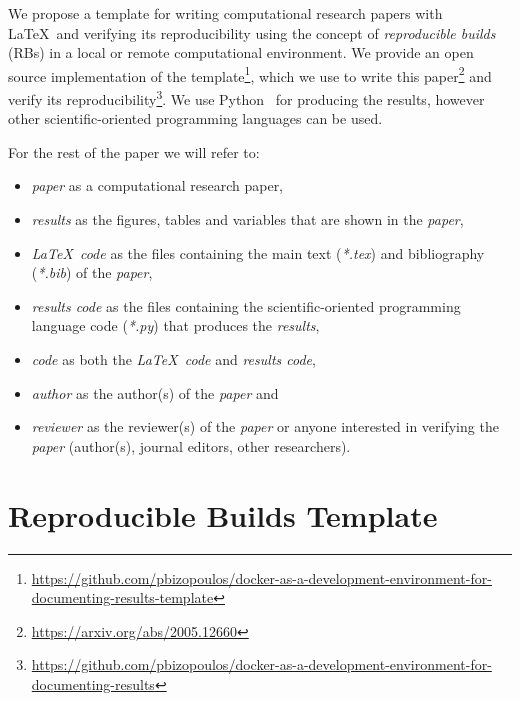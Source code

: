 \documentclass[journal]{IEEEtran}
\begin{document}
We propose a template for writing computational research papers with \LaTeX\ and verifying  its reproducibility using the concept of \textit{reproducible builds} (RBs) in a local or remote computational environment.
We provide an open source implementation of the template\footnote{\url{https://github.com/pbizopoulos/docker-as-a-development-environment-for-documenting-results-template}}, which we use to write this paper\footnote{\url{https://arxiv.org/abs/2005.12660}} and verify its reproducibility\footnote{\url{https://github.com/pbizopoulos/docker-as-a-development-environment-for-documenting-results}}.
We use Python~\cite{van2007python} for producing the results, however other scientific-oriented programming languages can be used.

For the rest of the paper we will refer to:
\begin{itemize}
	\item \textit{paper} as a computational research paper,
	\item \textit{results} as the figures, tables and variables that are shown in the \textit{paper},
	\item \textit{\LaTeX\ code} as the files containing the main text (\textit{*.tex}) and bibliography (\textit{*.bib}) of the \textit{paper},
	\item \textit{results code} as the files containing the scientific-oriented programming language code (\textit{*.py}) that produces the \textit{results},
	\item \textit{code} as both the \textit{\LaTeX\ code} and \textit{results code},
	\item \textit{author} as the author(s) of the \textit{paper} and
	\item \textit{reviewer} as the reviewer(s) of the \textit{paper} or anyone interested in verifying the \textit{paper} (author(s), journal editors, other researchers).
\end{itemize}

\section{Reproducible Builds Template}
\end{document}
